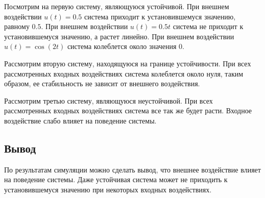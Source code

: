 Посмотрим на первую систему, являющуюся устойчивой. При внешнем воздействии $u(t) = 0.5$ система приходит к установившемуся
значению, равному $0.5$. При внешнем воздействии $u(t) = 0.5t$ система не приходит к установившемуся
значению, а растет линейно. При внешнем воздействии $u(t) = \cos(2t)$ система колеблется около значения 0. 

Рассмотрим вторую систему, находящуюся на границе устойчивости. При всех рассмотренных входных 
воздействиях система колеблется около нуля, таким образом, ее стабильность не зависит от внешнего воздействия.

Рассмотрим третью систему, являющуюся неустойчивой. При всех рассмотренных входных воздействиях система 
все так же будет расти. Входное воздействие слабо влияет на поведение системы.

\subsection{Вывод}
По результатам симуляции можно сделать вывод, что внешнее воздействие влияет на поведение системы.
Даже устойчивая система может не приходить к установившемуся значению при некоторых входных воздействиях.
